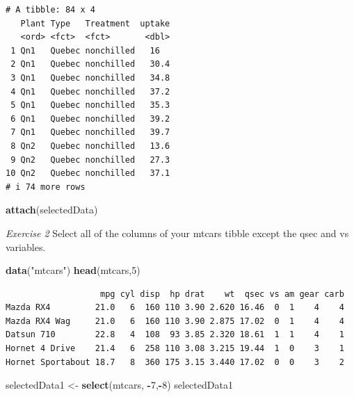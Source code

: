 \documentclass[
]{article}
\newenvironment{Shaded}{\begin{snugshade}}{\end{snugshade}}
\newcommand{\DecValTok}[1]{\textcolor[rgb]{0.00,0.00,0.81}{#1}}
\newcommand{\FunctionTok}[1]{\textcolor[rgb]{0.13,0.29,0.53}{\textbf{#1}}}
\newcommand{\NormalTok}[1]{#1}
\newcommand{\OtherTok}[1]{\textcolor[rgb]{0.56,0.35,0.01}{#1}}
\newcommand{\SpecialCharTok}[1]{\textcolor[rgb]{0.81,0.36,0.00}{\textbf{#1}}}
\newcommand{\StringTok}[1]{\textcolor[rgb]{0.31,0.60,0.02}{#1}}
\begin{document}
\begin{verbatim}
# A tibble: 84 x 4
   Plant Type   Treatment  uptake
   <ord> <fct>  <fct>       <dbl>
 1 Qn1   Quebec nonchilled   16  
 2 Qn1   Quebec nonchilled   30.4
 3 Qn1   Quebec nonchilled   34.8
 4 Qn1   Quebec nonchilled   37.2
 5 Qn1   Quebec nonchilled   35.3
 6 Qn1   Quebec nonchilled   39.2
 7 Qn1   Quebec nonchilled   39.7
 8 Qn2   Quebec nonchilled   13.6
 9 Qn2   Quebec nonchilled   27.3
10 Qn2   Quebec nonchilled   37.1
# i 74 more rows
\end{verbatim}

\begin{Shaded}
\begin{Highlighting}[]
\FunctionTok{attach}\NormalTok{(selectedData)}
\end{Highlighting}
\end{Shaded}

\emph{Exercise 2} Select all of the columns of your mtcars tibble except
the qsec and vs variables.

\begin{Shaded}
\begin{Highlighting}[]
\FunctionTok{data}\NormalTok{(}\StringTok{"mtcars"}\NormalTok{)}
\FunctionTok{head}\NormalTok{(mtcars,}\DecValTok{5}\NormalTok{)}
\end{Highlighting}
\end{Shaded}

\begin{verbatim}
                   mpg cyl disp  hp drat    wt  qsec vs am gear carb
Mazda RX4         21.0   6  160 110 3.90 2.620 16.46  0  1    4    4
Mazda RX4 Wag     21.0   6  160 110 3.90 2.875 17.02  0  1    4    4
Datsun 710        22.8   4  108  93 3.85 2.320 18.61  1  1    4    1
Hornet 4 Drive    21.4   6  258 110 3.08 3.215 19.44  1  0    3    1
Hornet Sportabout 18.7   8  360 175 3.15 3.440 17.02  0  0    3    2
\end{verbatim}

\begin{Shaded}
\begin{Highlighting}[]
\NormalTok{selectedData1 }\OtherTok{\textless{}{-}} \FunctionTok{select}\NormalTok{(mtcars, }\SpecialCharTok{{-}}\DecValTok{7}\NormalTok{,}\SpecialCharTok{{-}}\DecValTok{8}\NormalTok{)}
\NormalTok{selectedData1}
\end{Highlighting}
\end{Shaded}
\end{document}
